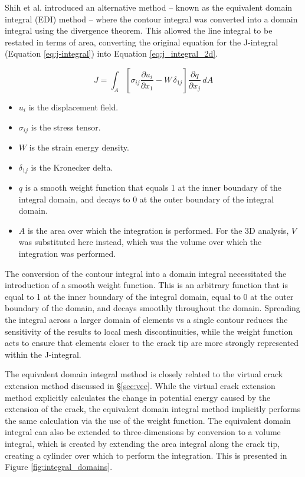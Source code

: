 Shih et al. \cite{shih_energy_1986} introduced an alternative method -- known as the equivalent domain integral (EDI) method -- where the contour integral was converted into a domain integral using the divergence theorem. This allowed the line integral to be restated in terms of area, converting the original equation for the J-integral (Equation \ref{eq:j-integral}) into Equation \ref{eq:j_integral_2d}.

\begin{equation}\label{eq:j_integral_2d}
	J = \int_A \left[\sigma_{ij}\frac{\partial u_i}{\partial x_1} - W\,\delta_{1j}\right]\frac{\partial q}{\partial x_j}\, dA
\end{equation}

\begin{itemize}
	\item \(u_i\) is the displacement field.
	\item \(\sigma_{ij}\) is the stress tensor.
	\item \(W\) is the strain energy density.
	\item \(\delta_{1j}\) is the Kronecker delta.
	\item \(q\) is a smooth weight function that equals 1 at the inner boundary of the integral domain, and decays to 0 at the outer boundary of the integral domain.
	\item \(A\) is the area over which the integration is performed. For the 3D analysis, $V$ was substituted here instead, which was the volume over which the integration was performed.
\end{itemize}

The conversion of the contour integral into a domain integral necessitated the introduction of a smooth weight function. This is an arbitrary function that is equal to 1 at the inner boundary of the integral domain, equal to 0 at the outer boundary of the domain, and decays smoothly throughout the domain. Spreading the integral across a larger domain of elements vs a single contour reduces the sensitivity of the results to local mesh discontinuities, while the weight function acts to ensure that elements closer to the crack tip are more strongly represented within the J-integral.

The equivalent domain integral method is closely related to the virtual crack extension method discussed in \S\ref{sec:vce}. While the virtual crack extension method explicitly calculates the change in potential energy caused by the extension of the crack, the equivalent domain integral method implicitly performs the same calculation via the use of the weight function. The equivalent domain integral can also be extended to three-dimensions by conversion to a volume integral, which is created by extending the area integral along the crack tip, creating a cylinder over which to perform the integration. This is presented in Figure \ref{fig:integral_domains}.

